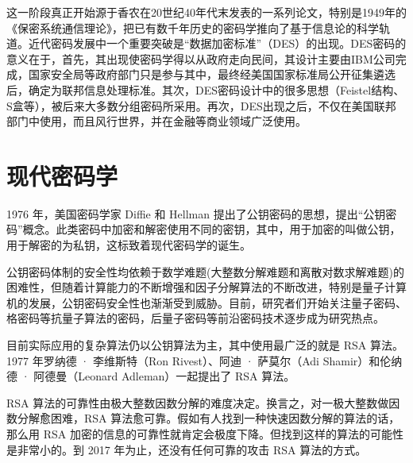 这一阶段真正开始源于香农在20世纪40年代末发表的一系列论文，特别是1949年的《保密系统通信理论》，把已有数千年历史的密码学推向了基于信息论的科学轨道。近代密码发展中一个重要突破是“数据加密标准”（DES）的出现。DES密码的意义在于，首先，其出现使密码学得以从政府走向民间，其设计主要由IBM公司完成，国家安全局等政府部门只是参与其中，最终经美国国家标准局公开征集遴选后，确定为联邦信息处理标准。其次，DES密码设计中的很多思想（Feistel结构、S盒等），被后来大多数分组密码所采用。再次，DES出现之后，不仅在美国联邦部门中使用，而且风行世界，并在金融等商业领域广泛使用。

\section{现代密码学}

1976 年，美国密码学家 Diffie 和 Hellman 提出了公钥密码的思想，提出“公钥密码”概念。此类密码中加密和解密使用不同的密钥，其中，用于加密的叫做公钥，用于解密的为私钥，这标致着现代密码学的诞生。

公钥密码体制的安全性均依赖于数学难题(大整数分解难题和离散对数求解难题)的困难性，但随着计算能力的不断增强和因子分解算法的不断改进，特别是量子计算机的发展，公钥密码安全性也渐渐受到威胁。目前，研究者们开始关注量子密码、格密码等抗量子算法的密码，后量子密码等前沿密码技术逐步成为研究热点。

目前实际应用的复杂算法仍以公钥算法为主，其中使用最广泛的就是 RSA 算法。1977 年罗纳德 · 李维斯特（Ron Rivest）、阿迪 · 萨莫尔（Adi Shamir）和伦纳德 · 阿德曼（Leonard Adleman）一起提出了 RSA 算法。

RSA 算法的可靠性由极大整数因数分解的难度决定。换言之，对一极大整数做因数分解愈困难，RSA 算法愈可靠。假如有人找到一种快速因数分解的算法的话，那么用 RSA 加密的信息的可靠性就肯定会极度下降。但找到这样的算法的可能性是非常小的。到 2017 年为止，还没有任何可靠的攻击 RSA 算法的方式。
